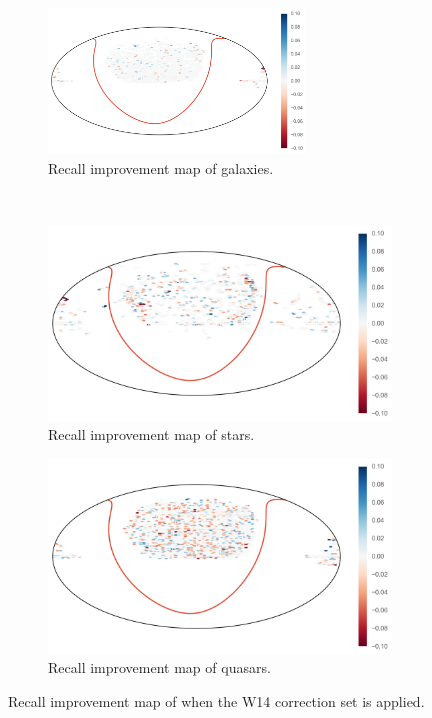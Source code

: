 \begin{figure}[p]
	\centering
	\begin{subfigure}{\textwidth}
		\centering
		\includegraphics[width=0.75\textwidth]{figures/appendix/map_recall_w14_Galaxy}
		\caption{Recall improvement map of galaxies.}
		\label{fig:map_recall_w14_galaxies}
	\end{subfigure}\\
	\begin{subfigure}{\textwidth}
		\centering
		\includegraphics[width=0.75\linewidth]{figures/appendix/map_recall_w14_Star}
		\caption{Recall improvement map of stars.}
		\label{fig:map_recall_w14_stars}
	\end{subfigure}
	\begin{subfigure}{\textwidth}
		\centering
		\includegraphics[width=0.75\linewidth]{figures/appendix/map_recall_w14_Quasar}
		\caption{Recall improvement map of quasars.}
		\label{fig:map_recall_w14_quasars}
	\end{subfigure}
	\caption{Recall improvement map of when the W14 correction set is applied.}
	\label{fig:map_recall_w14}
\end{figure}


